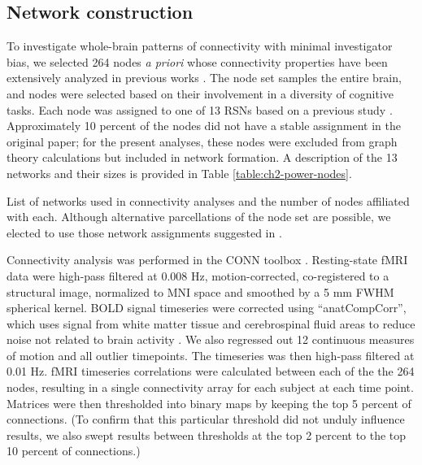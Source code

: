 \subsection{Network construction}

To investigate whole-brain patterns of connectivity with minimal investigator bias, we selected 264 nodes \textit{a priori} whose connectivity properties have been extensively analyzed in previous works \citep{Power2011, Power2013, Cole2014}. The node set samples the entire brain, and nodes were selected based on their involvement in a diversity of cognitive tasks. Each node was assigned to one of 13 RSNs based on a previous study \citep{Power2013}. Approximately 10 percent of the nodes did not have a stable assignment in the original paper; for the present analyses, these nodes were excluded from graph theory calculations but included in network formation. A description of the 13 networks and their sizes is provided in Table \ref{table:ch2-power-nodes}. 

\begin{table}[t]
	\renewcommand{\tabcolsep}{0.09cm}
	\centering
	
	\caption[List of resting-state networks]{List of networks used in connectivity analyses and the number of nodes affiliated with each. Although alternative parcellations of the node set are possible, we elected to use those network assignments suggested in \citep{Power2013}.}
	\label{table:ch2-power-nodes}
\end{table}

Connectivity analysis was performed in the CONN toolbox \citep{WhitfieldGabrieli2012}. Resting-state fMRI data were high-pass filtered at 0.008 Hz, motion-corrected, co-registered to a structural image, normalized to MNI space and smoothed by a 5 mm FWHM spherical kernel. BOLD signal timeseries were corrected using ``anatCompCorr'', which uses signal from white matter tissue and cerebrospinal fluid areas to reduce noise not related to brain activity \citep{Chai2012}. We also regressed out 12 continuous measures of motion and all outlier timepoints. The timeseries was then high-pass filtered at 0.01 Hz. fMRI timeseries correlations were calculated between each of the the 264 nodes, resulting in a single connectivity array for each subject at each time point. Matrices were then thresholded into binary maps by keeping the top 5 percent of connections. (To confirm that this particular threshold did not unduly influence results, we also swept results between thresholds at the top 2 percent to the top 10 percent of connections.)

